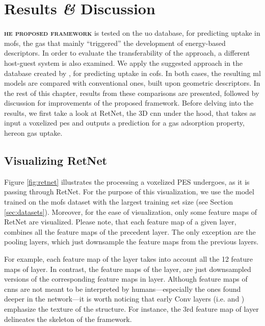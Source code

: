 \chapter{Results \textit{\&} Discussion}

\lettrine[
	nindent=0em, findent=0.5em, loversize=-0.12, lines=5
]{}{\bfseries\color{Blue}he proposed framework} is tested on the
\gls{uo} database, for predicting  uptake in \glspl{mof}, the
gas that mainly ``triggered'' the development of energy-based
descriptors. In order to evaluate the
transferability of the approach, a different host-guest system is also examined.
We apply the suggested approach in the database created by
\textcite{Mercado_2018}, for predicting  uptake in \glspl{cof}. In both
cases, the resulting \gls{ml} models are compared with conventional ones, built
upon geometric descriptors. In the rest of this
chapter, results from these comparisons are presented, followed by discussion
for improvements of the proposed framework. Before delving into the results, we
first take a look at RetNet, the 3D \gls{cnn} under the hood, that
takes as input a voxelized \gls{pes} and outputs a
prediction for a gas adsorption property, hereon gas
uptake.

\section{Visualizing RetNet}

Figure \ref{fig:retnet} illustrates the processing a voxelized PES undergoes, as
it is passing through RetNet. For the purpose of this visualization, we use the
model trained on the \glspl{mof} dataset with the largest training set size (see
Section \ref{sec:datasets}). Moreover, for the ease of visualization, only some
feature maps of RetNet are visualized. Please note, that each feature
map of a given layer, combines all the feature maps of the
precedent layer. The only exception are the pooling layers,
which just downsample the feature maps from the previous
layers.

For example, each feature map of the  layer takes into account all
the 12 feature maps of  layer. In contrast, the feature maps of the
 layer, are just downsampled versions of the corresponding feature maps
in  layer. Although feature maps of \glspl{cnn} are not meant to be
interpreted by humans---especially the ones found deeper in the network---it is
worth noticing that early Conv layers (i.e.  and
) emphasize the texture of the structure. For instance, the 3rd
feature map of  layer delineates the skeleton of the framework.

